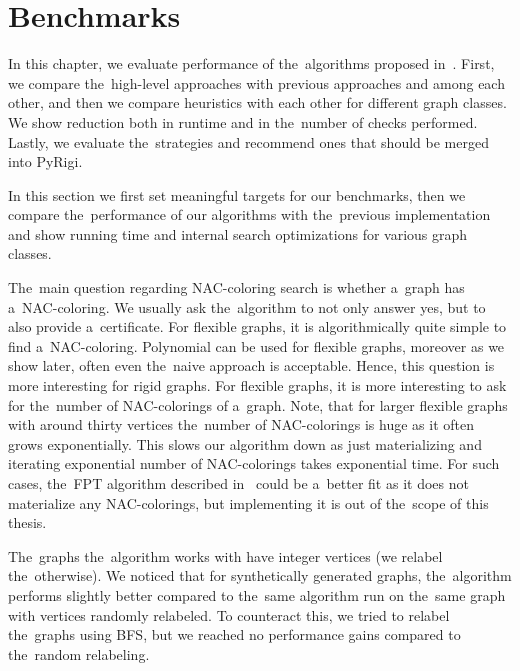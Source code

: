 \chapter{Benchmarks}%
\label{chapter:benchmarks}

\begin{chapterabstract}

	In this chapter,
	we evaluate performance of the~algorithms
	proposed in~.
	First, we compare the~high-level approaches with previous approaches and among each other,
	and then we compare heuristics with each other
	for different  graph classes.
	We show reduction both in runtime and in the~number
	of \IsNACColoring{} checks performed.
	Lastly, we evaluate the~strategies and
	recommend ones that should be merged into PyRigi.

\end{chapterabstract}

In this section we first set meaningful targets for our benchmarks,
then we compare the~performance of our algorithms with the~previous implementation
and show running time and internal search optimizations for various graph classes.

The~main question regarding NAC-coloring search is whether a~graph has a~NAC-coloring.
We usually ask the~algorithm to not only answer yes, but to also provide a~certificate.
%
For flexible graphs, it is algorithmically quite simple to find a~NAC-coloring.
Polynomial 
can be used for flexible graphs,
moreover as we show later, often even the~naive approach is acceptable.
Hence, this question is more interesting for rigid graphs.
%
For flexible graphs, it is more interesting to ask for the~number of NAC-colorings
of a~graph.
Note, that for larger flexible graphs with around thirty vertices
the~number of NAC-colorings is huge as it often grows exponentially.
This slows our algorithm down as just materializing and iterating exponential
number of NAC-colorings takes exponential time.
%
For such cases, the~FPT algorithm described in~
could be a~better fit as it does not materialize any NAC-colorings,
but implementing it is out of the~scope of this thesis.

The~graphs the~algorithm works with have integer vertices (we relabel the~otherwise).
We noticed that for synthetically generated graphs,
the~algorithm performs slightly better compared to
the~same algorithm run on the~same graph with vertices randomly relabeled.
To counteract this, we tried to relabel the~graphs using BFS,
but we reached no performance gains compared to the~random relabeling.

